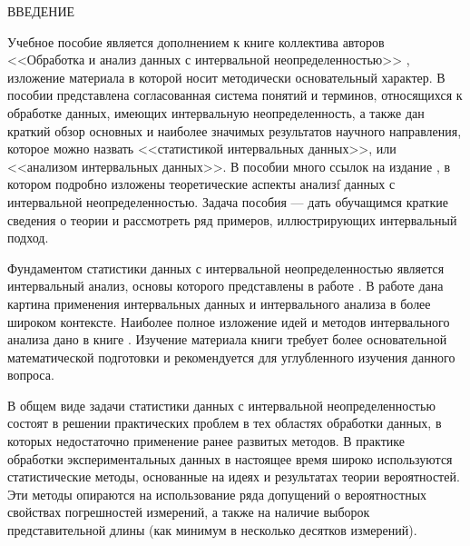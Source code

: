 \documentclass[a5paper,openany]{book}
\begin{document}
{	\thispagestyle{empty}

\newpage
\tableofcontents

\newpage






\begin{center}
	\large ВВЕДЕНИЕ
\end{center}	


Учебное пособие является дополнением к книге коллектива авторов
<<Обработка и анализ данных с интервальной неопределенностью>> \cite{MetodikaBook}, изложение материала в которой носит методически основательный характер.
В пособии представлена согласованная система понятий и терминов, относящихся к обработке данных, имеющих интервальную  неопределенность, а также
дан краткий обзор основных и наиболее значимых результатов научного направления, которое можно назвать <<статистикой интервальных данных>>, или <<анализом интервальных 
данных>>. В пособии много ссылок на издание \cite{MetodikaBook}, в котором подробно изложены теоретические аспекты анализf данных с интервальной неопределенностью.
Задача пособия --- дать обучащимся краткие сведения о теории и рассмотреть ряд примеров, иллюстрирующих интервальный подход. 


Фундаментом статистики данных с интервальной неопределенностью является интервальный анализ, 
основы которого  представлены в  работе \cite{SPbSTU2020}. В работе  \cite{SPbSTU2021} дана картина применения интервальных данных и интервального анализа в более широком контексте. 
Наиболее полное изложение идей и методов интервального анализа дано в книге \cite{SSharyBook}. Изучение материала  книги  \cite{SSharyBook} требует более основательной математической подготовки и рекомендуется для углубленного изучения данного вопроса.

В общем виде задачи статистики данных с интервальной неопределенностью состоят в решении практических проблем в тех областях обработки данных, в которых недостаточно применение ранее развитых методов.
В практике обработки экспериментальных данных в настоящее время широко используются 
статистические методы, основанные на идеях и результатах теории вероятностей. Эти методы 
опираются на использование ряда допущений о вероятностных свойствах погрешностей 
измерений, а также на наличие выборок представительной длины (как минимум в несколько 
десятков измерений). 

}
\end{document}
